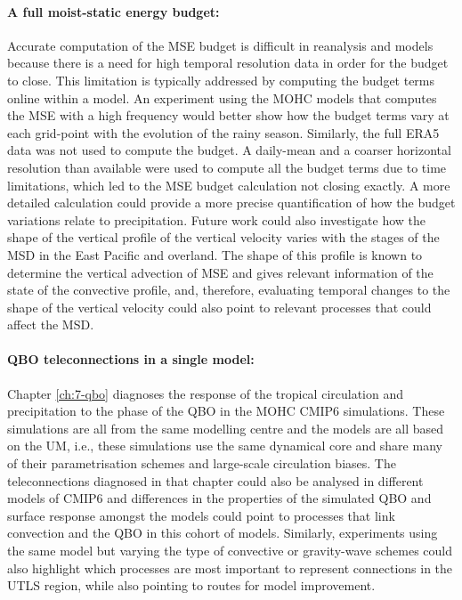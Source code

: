 \paragraph{A full moist-static energy budget:}
Accurate computation of the MSE budget is difficult in reanalysis and models because there is a need for high temporal resolution data in order for the budget to close. 
This limitation is typically addressed by computing the budget terms online within a model. 
An experiment using the MOHC models that computes the MSE with a high frequency would better show how the budget terms vary at each grid-point with the evolution of the rainy season. 
Similarly, the full ERA5 data was not used to compute the budget. A daily-mean and a coarser horizontal resolution than available were used to compute all the budget terms due to time limitations, which led to the MSE budget calculation not closing exactly. 
A more detailed calculation could provide a more precise quantification of how the budget variations relate to precipitation. 
Future work could also investigate how the shape of the vertical profile of the vertical velocity varies with the stages of the MSD in the East Pacific and overland. 
The shape of this profile is known to determine the vertical advection of MSE and gives relevant information of the state of the convective profile, and, therefore, evaluating temporal changes to the shape of the vertical velocity could also point to relevant processes that could affect the MSD.

\paragraph{QBO teleconnections in a single model:}
Chapter \ref{ch:7-qbo} diagnoses the response of the tropical circulation and precipitation to the phase of the QBO in the MOHC CMIP6 simulations. 
These simulations are all from the same modelling centre and the models are all based on the UM, i.e., these simulations use the same dynamical core and share many of their parametrisation schemes and large-scale circulation biases. 
The teleconnections diagnosed in that chapter could also be analysed in different models of CMIP6 and differences in the properties of the simulated QBO and surface response amongst the models could point to processes that link convection and the QBO in this cohort of models. 
Similarly, experiments using the same model but varying the type of convective or gravity-wave schemes could also highlight which processes are most important to represent connections in the UTLS region, while also pointing to routes for model improvement. 

